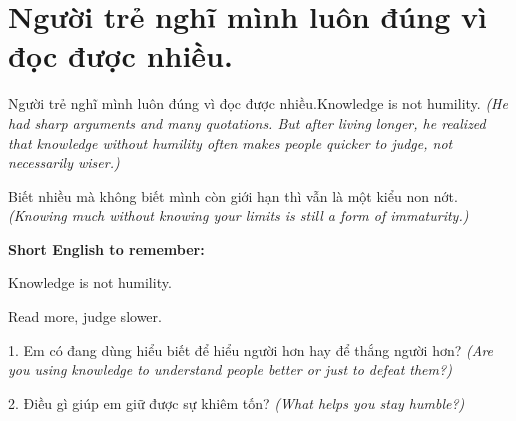 \section{Người trẻ nghĩ mình luôn đúng vì đọc được nhiều.}
\begin{truyen}{Người trẻ nghĩ mình luôn đúng vì đọc được nhiều.}{Knowledge is not humility.}
\textit{(He had sharp arguments and many quotations. But after living longer, he realized that knowledge without humility often makes people quicker to judge, not necessarily wiser.)}
\end{truyen}
\begin{baihoc}
Biết nhiều mà không biết mình còn giới hạn thì vẫn là một kiểu non nớt.
\textit{(Knowing much without knowing your limits is still a form of immaturity.)}
\end{baihoc}
\begin{ghinhoanh}
\textbf{Short English to remember:}

Knowledge is not humility.

Read more, judge slower.
\end{ghinhoanh}
\begin{tuhocnhanh}
1. Em có đang dùng hiểu biết để hiểu người hơn hay để thắng người hơn? \textit{(Are you using knowledge to understand people better or just to defeat them?)}

2. Điều gì giúp em giữ được sự khiêm tốn? \textit{(What helps you stay humble?)}
\end{tuhocnhanh}
\ngancach

